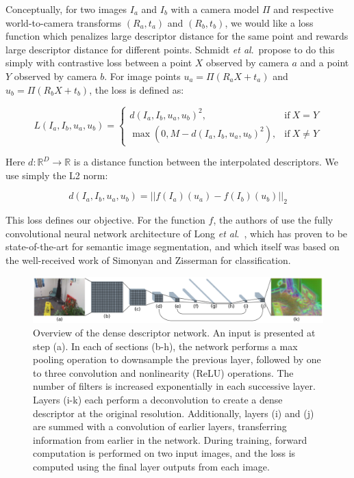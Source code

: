 Conceptually, for two images $I_a$ and $I_b$ with a camera model $\Pi$ and respective world-to-camera transforms $(R_a, t_a)$ and $(R_b, t_b)$, we would like a loss function which penalizes large descriptor distance for the same point and rewards large descriptor distance for different points. Schmidt \textit{et al}.\ propose to do this simply with contrastive loss between a point $X$ observed by camera $a$ and a point $Y$ observed by camera $b$. For image points $u_a = \Pi(R_a X + t_a)$ and $u_b = \Pi(R_b X + t_b)$, the loss is defined as:

\begin{equation}
L(I_a, I_b, u_a, u_b) = \begin{cases}
d(I_a, I_b, u_a, u_b)^2 , & \text{if}\ X = Y \\
\max(0, M - d(I_a, I_b, u_a, u_b)^2), & \text{if}\ X \ne Y
\end{cases}
\end{equation}

Here $d : \mathbb{R}^D \to \mathbb{R}$ is a distance function between the interpolated descriptors. We use simply the L2 norm:

\begin{equation}
d(I_a, I_b, u_a, u_b) = ||f(I_a)(u_a) - f(I_b)(u_b)||_2
\end{equation}

This loss defines our objective. For the function $f$, the authors of \cite{schmidt2017self} use the fully convolutional neural network architecture of Long \textit{et al}.\ \cite{long2015fully}, which has proven to be state-of-the-art for semantic image segmentation, and which itself was based on the well-received work of Simonyan and Zisserman \cite{simonyan2014very} for classification. 

\begin{figure}[h]
	\centering
	\includegraphics[width=\linewidth]{methodology/nn_architecture.png}
	\caption{Overview of the dense descriptor network. An input is presented at step (a). In each of sections (b-h), the network performs a max pooling operation to downsample the previous layer, followed by one to three convolution and nonlinearity (ReLU) operations. The number of filters is increased exponentially in each successive layer. Layers (i-k) each perform a deconvolution to create a dense descriptor at the original resolution. Additionally, layers (i) and (j) are summed with a convolution of earlier layers, transferring information from earlier in the network. During training, forward computation is performed on two input images, and the loss is computed using the final layer outputs from each image.}
	\label{fig:nn_architecture}
\end{figure}

